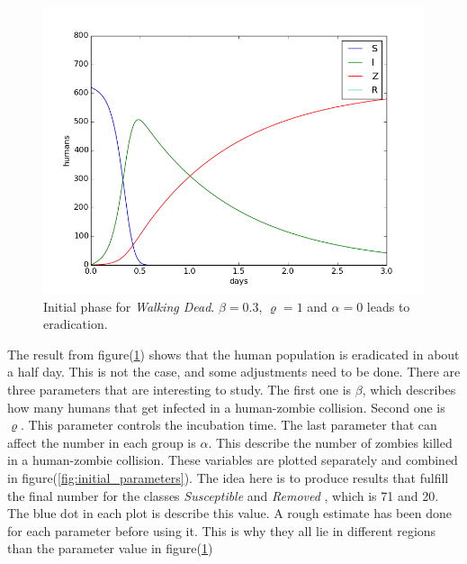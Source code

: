\documentclass[%
twoside,                 %
final,                   %
10pt]{article}
\begin{document}
\begin{figure}[ht]
  \centerline{\includegraphics[width=0.9\linewidth]{plots/WD_zombie_initial_1.png}}
  \caption{
  \label{fig:initial_phase_1} Initial phase for \emph{Walking Dead}. $\beta=0.3$, $\varrho=1$ and $\alpha=0$ leads to eradication.
  }
\end{figure}


The result from figure(\ref{fig:initial_phase_1}) shows that the human population is eradicated in about a half day. This is not the case, and some adjustments need to be done. There are three parameters that are interesting to study. The first one is $\beta$, which describes how many humans that get infected in a human-zombie collision. Second one is $\varrho$. This parameter controls the incubation time. The last parameter that can affect the number in each group is $\alpha$. This describe the number of zombies killed in a human-zombie collision. These variables are plotted separately and combined in figure(\ref{fig:initial_parameters}). The idea here is to produce results that fulfill the final number for the classes \emph{Susceptible} and \emph{Removed} , which is 71 and 20. The blue dot in each plot is describe this value. A rough estimate has been done for each parameter before using it. This is why they all lie in different regions than the parameter value in figure(\ref{fig:initial_phase_1})
\end{document}

